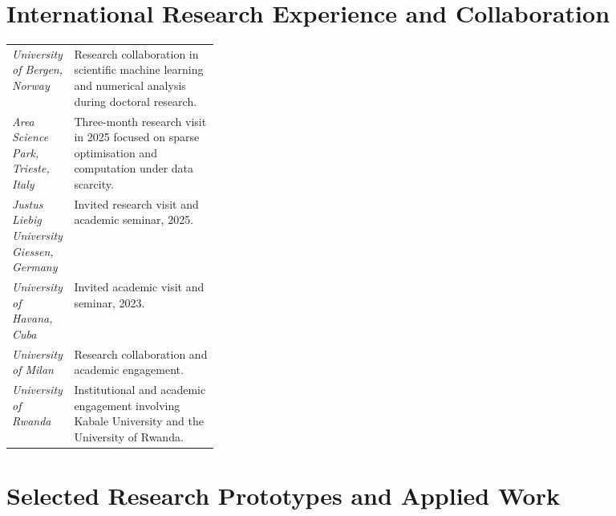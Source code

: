 \documentclass[11pt,a4paper]{article}
\begin{document}
\section{International Research Experience and Collaboration}

\begin{tabularx}{\linewidth}
{@{}>{\raggedright\arraybackslash}p{0.30\linewidth} X@{}}

\textit{University of Bergen, Norway}
&
Research collaboration in scientific machine learning and numerical
analysis during doctoral research.
\\[3pt]

\textit{Area Science Park, Trieste, Italy}
&
Three-month research visit in 2025 focused on sparse optimisation
and computation under data scarcity.
\\[3pt]

\textit{Justus Liebig University Giessen, Germany}
&
Invited research visit and academic seminar, 2025.
\\[3pt]

\textit{University of Havana, Cuba}
&
Invited academic visit and seminar, 2023.
\\[3pt]

\textit{University of Milan}
&
Research collaboration and academic engagement.
\\[3pt]

\textit{University of Rwanda}
&
Institutional and academic engagement involving Kabale University
and the University of Rwanda.

\end{tabularx}

\section{Selected Research Prototypes and Applied Work}
\end{document}
